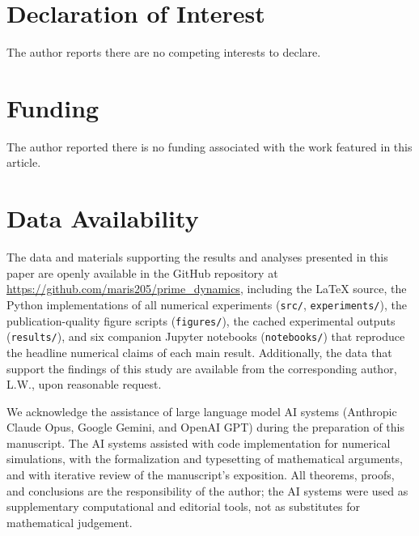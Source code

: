 \documentclass[cupthm,crop,info]{CUP-JNL-ETS}
\theoremstyle{cupplain}
\theoremstyle{cupdefinition}
\theoremstyle{cupremark}
\numberwithin{equation}{section}
\begin{document}
\begin{Backmatter}

\section*{Declaration of Interest}
The author reports there are no competing interests to declare.

\section*{Funding}
The author reported there is no funding associated with the work
featured in this article.

\section*{Data Availability}
The data and materials supporting the results and analyses presented
in this paper are openly available in the GitHub repository at
\url{https://github.com/maris205/prime_dynamics}, including the LaTeX
source, the Python implementations of all numerical experiments
(\texttt{src/}, \texttt{experiments/}), the publication-quality figure
scripts (\texttt{figures/}), the cached experimental outputs
(\texttt{results/}), and six companion Jupyter notebooks
(\texttt{notebooks/}) that reproduce the headline numerical claims of
each main result. Additionally, the data that support the findings of
this study are available from the corresponding author, L.W., upon
reasonable request.

\begin{ack}
We acknowledge the assistance of large language model AI systems
(Anthropic Claude Opus, Google Gemini, and OpenAI GPT) during the
preparation of this manuscript. The AI systems assisted with code
implementation for numerical simulations, with the formalization and
typesetting of mathematical arguments, and with iterative review of
the manuscript's exposition. All theorems, proofs, and conclusions
are the responsibility of the author; the AI systems were used as
supplementary computational and editorial tools, not as substitutes
for mathematical judgement.
\end{ack}




\end{Backmatter}
\end{document}
